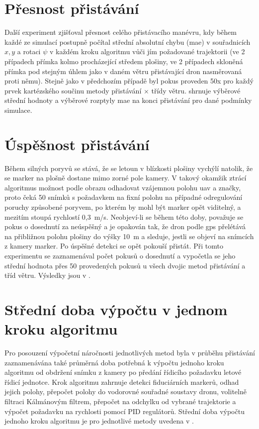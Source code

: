   \section{Přesnost přistávání} \label{sec:presnostPristavani}
    Další experiment zjišťoval přesnost celého přistávacího manévru, kdy během každé ze simulací postupně počítal střední absolutní chybu (\acrshort{mae}) v souřadnicích $x, y$ a rotaci $\psi$ v každém kroku algoritmu vůči jím požadované trajektorii (ve 2 případech přímka kolmo procházející středem plošiny, ve 2 případech skloněná přímka pod stejným úhlem jako v daném větru přistávající dron nasměrovaná proti němu). Stejně jako v předchozím případě byl pokus proveden 50x pro každý prvek kartézského součinu metody přistávání $\times$ třídy větru.  shrnuje výběrové střední hodnoty a výběrové rozptyly \acrshort{mae} na konci přistávání pro dané podmínky simulace.
  \section{Úspěšnost přistávání} \label{sec:uspesnost}
    Během silných poryvů se stává, že se letoun v blízkosti plošiny vychýlí natolik, že se marker na plošně dostane mimo zorné pole kamery. V takový okamžik ztrácí algoritmus možnost podle obrazu odhadovat vzájemnou polohu \acrshort{uav} a značky, proto čeká 50 snímků s požadavkem na fixní polohu na případné odregulování poruchy způsobené poryvem, po kterém by mohl být marker opět viditelný, a mezitím stoupá rychlostí 0{,}3~m/s. Neobjeví-li se během této doby, považuje se pokus o dosednutí za neúspěšný a je opakován tak, že dron podle \acrshort{gps} přelétává na přibližnou polohu plošiny do výšky 10~m a sleduje, jestli se objeví na snímcích z kamery marker. Po úspěšné detekci se opět pokouší přistát. Při tomto experimentu se zaznamenával počet pokusů o dosednutí a vypočetla se jeho střední hodnota přes 50 provedených pokusů u všech dvojic metod přistávání a tříd větru. Výsledky jsou v .
  \section{Střední doba výpočtu v jednom kroku algoritmu} \label{sec:stredniDobaVypoctu}
    Pro posouzení výpočetní náročnosti jednotlivých metod byla v průběhu přistávání zaznamenávána také průměrná doba potřebná k výpočtu jednoho kroku algoritmu od obdržení snímku z kamery po předání řídicího požadavku letové řídicí jednotce. Krok algoritmu zahrnuje detekci fiduciárních markerů, odhad jejich polohy, přepočet polohy do vodorovné souřadné soustavy dronu, volitelně filtraci Kálmánovým filtrem, přepočet na odchylku od vybrané trajektorie a výpočet požadavku na rychlosti pomocí PID regulátorů. Střední doba výpočtu jednoho kroku algoritmu je pro jednotlivé metody uvedena v .
